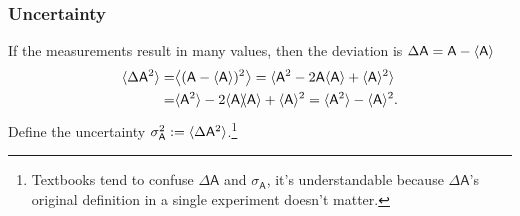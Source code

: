 \documentclass{article}
\newcommand*{\op}[1]{\mathsf{#1}}
\newcommand{\ko}[1]{\hspace{-#1 pt}}
\begin{document}
\subsubsection{Uncertainty}
If the measurements result in many values, then the deviation is $\Delta\op{A}=\op{A}-\ave{\op{A}}$
\begin{align*}
	\ave{\Delta\op{A}^2}= & \bigave{(\op{A}-\ave{\op{A}})^2}=\ave{\op{A}^2-2\op{A}\ave{\op{A}}+\ave{\op{A}}^2} \\
	=                  & \ave{\op{A}^2}-2\ave{\op{A}}\ko3\ave{\op{A}}+\ave{\op{A}}^2=\ave{\op{A}^2}-\ave{\op{A}}^2.
\end{align*}
Define the uncertainty $\sigma_{\op{A}}^2:=\ave{\Delta\op{A}^2}$.\footnote{Textbooks tend to confuse $\Delta\op{A}$ and $\sigma_{\op{A}}$, it's understandable because $\Delta\op{A}$'s original definition in a single experiment doesn't matter.}
\end{document}
